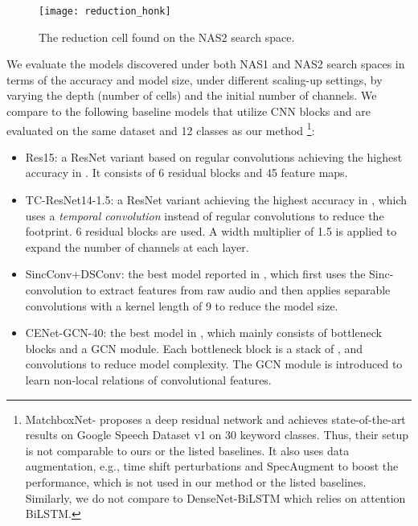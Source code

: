 \documentclass[a4paper]{article}
\begin{document}
\begin{figure}[!t]
    \centering
    \texttt{[image: reduction\_honk]}
    \vspace{-10.5mm}
    \caption{The reduction cell found on the NAS2 search space.}
    \label{fig:reduction_honk}
\end{figure}


We evaluate the models discovered under both NAS1 and NAS2 search spaces in terms of the accuracy and model size, under different scaling-up settings, by varying the depth (number of cells) and the initial number of channels.  
We compare to the following baseline models that 
utilize CNN blocks and 
are evaluated on the same dataset and 12 classes as our method \footnote{MatchboxNet- \cite{majumdar2020matchboxnet} proposes a deep residual network and achieves state-of-the-art results on Google Speech Dataset v1 on 30 keyword classes. Thus, their setup is not comparable to ours or the listed baselines. It also uses data augmentation, e.g., time shift perturbations and SpecAugment to boost the performance, which is not used in our method or the listed baselines. 
Similarly, we do not compare to DenseNet-BiLSTM \cite{zeng2019effective} which relies on attention BiLSTM.
}:
\begin{itemize}
    \item Res15: a ResNet variant based on regular convolutions achieving the highest accuracy in \cite{tang2018deep}. It consists of 6 residual blocks and 45 feature maps. \item TC-ResNet14-1.5: a ResNet variant achieving the highest accuracy in \cite{choi2019temporal}, which uses a  \textit{temporal convolution} instead of regular convolutions to reduce the footprint. 6 residual blocks are used. A width multiplier of 1.5 is applied to expand the number of channels at each layer.
    \item SincConv+DSConv: the best model reported in \cite{mittermaier2019small}, which first uses the Sinc-convolution to extract features from raw audio and then applies separable convolutions with a kernel length of 9 to reduce the model size.
    \item CENet-GCN-40: the best model in \cite{chen2019small}, which mainly consists of bottleneck blocks and a GCN module. Each bottleneck block is a stack of ,  and  convolutions to reduce model complexity. The GCN module is introduced to learn non-local relations of convolutional features. \end{itemize}
\end{document}
